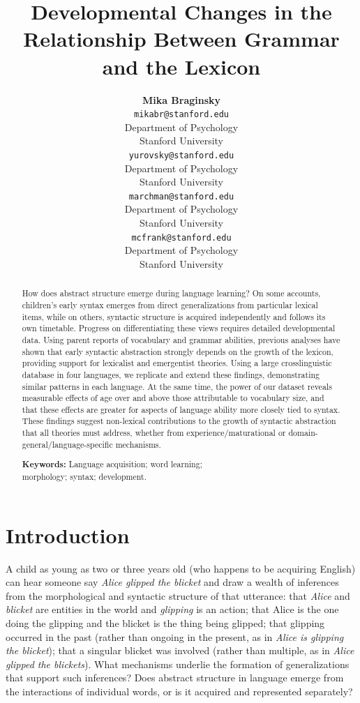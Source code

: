\documentclass[10pt,letterpaper]{article}
\title{Developmental Changes in the Relationship Between Grammar and the Lexicon}
\author{{\large \bf Mika Braginsky} \\
  \texttt{mikabr@stanford.edu} \\
  Department of Psychology \\
  Stanford University
  \And {\large \bf Daniel Yurovsky} \\
  \texttt{yurovsky@stanford.edu} \\
  Department of Psychology \\
  Stanford University
    \And {\large \bf Virginia A. Marchman} \\
    \texttt{marchman@stanford.edu} \\
  Department of Psychology \\
  Stanford University
    \And {\large \bf Michael C. Frank}\\
    \texttt{mcfrank@stanford.edu} \\
  Department of Psychology \\
  Stanford University}
\begin{document}
\maketitle

\begin{abstract}

How does abstract structure emerge during language learning? On some accounts, children's early syntax emerges from direct generalizations from particular lexical items, while on others, syntactic structure is acquired independently and follows its own timetable. Progress on differentiating these views requires detailed developmental data. Using parent reports of vocabulary and grammar abilities, previous analyses have shown that early syntactic abstraction strongly depends on the growth of the lexicon, providing support for lexicalist and emergentist theories. Using a large crosslinguistic database in four languages, we replicate and extend these findings, demonstrating similar patterns in each language. At the same time, the power of our dataset reveals measurable effects of age over and above those attributable to vocabulary size, and that these effects are greater for aspects of language ability more closely tied to syntax. These findings suggest non-lexical contributions to the growth of syntactic abstraction that all theories must address, whether from experience/maturational or domain-general/language-specific mechanisms.

\textbf{Keywords:} 
Language acquisition; word learning; \\morphology; syntax; development.
\end{abstract}

\section{Introduction}

A child as young as two or three years old (who happens to be acquiring English) can hear someone say \emph{Alice glipped the blicket} and draw a wealth of inferences from the morphological and syntactic structure of that utterance: that \emph{Alice} and \emph{blicket} are entities in the world and \emph{glipping} is an action; that Alice is the one doing the glipping and the blicket is the thing being glipped; that glipping occurred in the past (rather than ongoing in the present, as in \emph{Alice is glipping the blicket}); that a singular blicket was involved (rather than multiple, as in \emph{Alice glipped the blickets}). What mechanisms underlie the formation of generalizations that support such inferences? Does abstract structure in language emerge from the interactions of individual words, or is it acquired and represented separately?
\end{document}
